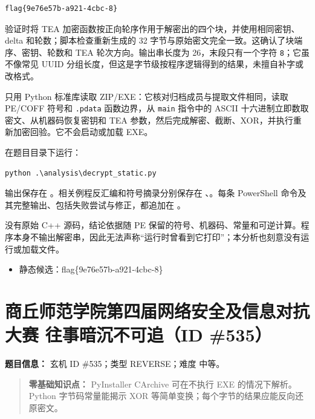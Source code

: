 \begin{verbatim}
flag{9e76e57b-a921-4cbc-8}
\end{verbatim}

验证时将 TEA 加密函数按正向轮序作用于解密出的四个块，并使用相同密钥、delta 和轮数；脚本检查重新生成的 32 字节与原始密文完全一致。这确认了块端序、密钥、轮数和 TEA 轮次方向。输出串长度为 26，末段只有一个字符 \texttt{8}；它虽不像常见 UUID 分组长度，但这是字节级按程序逻辑得到的结果，未擅自补字或改格式。

\texttt{} 只用 Python 标准库读取 ZIP/EXE：它核对归档成员与提取文件相同，读取 PE/COFF 符号和 \texttt{.pdata} 函数边界，从 \texttt{main} 指令中的 ASCII 十六进制立即数取密文、从机器码恢复密钥和 TEA 参数，然后完成解密、截断、XOR，并执行重新加密回验。它不会启动或加载 EXE。

在题目目录下运行：

\begin{verbatim}
python .\analysis\decrypt_static.py
\end{verbatim}

输出保存在 \texttt{}。相关例程反汇编和符号摘录分别保存在 \texttt{}、\texttt{}。每条 PowerShell 命令及其完整输出、包括失败尝试与修正，都追加在 \texttt{}。

没有原始 C++ 源码，结论依据随 PE 保留的符号、机器码、常量和可逆计算。程序本身不输出解密串，因此无法声称``运行时曾看到它打印''；本分析也刻意没有运行或加载文件。

\begin{itemize}
\tightlist
\item
  静态候选：flag\{9e76e57b-a921-4cbc-8\}
\end{itemize}

\section{商丘师范学院第四届网络安全及信息对抗大赛 往事暗沉不可追（ID \#535）}\label{ux5546ux4e18ux5e08ux8303ux5b66ux9662ux7b2cux56dbux5c4aux7f51ux7edcux5b89ux5168ux53caux4fe1ux606fux5bf9ux6297ux5927ux8d5b-ux5f80ux4e8bux6697ux6c89ux4e0dux53efux8ffdid-535}

\textbf{题目信息：} 玄机 ID \#535；类型 REVERSE；难度 中等。

\begin{quote}
\textbf{零基础知识点：} PyInstaller CArchive 可在不执行 EXE 的情况下解析。Python 字节码常量能揭示 XOR 等简单变换；每个字节的结果应能反向还原密文。
\end{quote}

